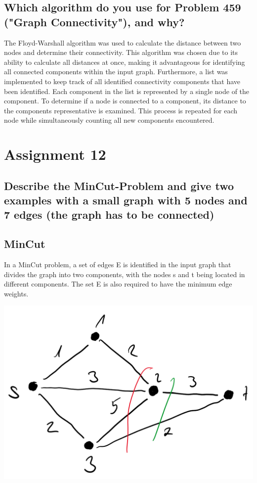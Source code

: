 \documentclass[runningheads]{llncs}
\begin{document}
\subsection*{Which algorithm do you use for Problem 459 ("Graph Connectivity"), and why?}
The Floyd-Warshall algorithm was used to calculate the distance between two nodes and determine their connectivity. This algorithm was chosen due to its ability to calculate all distances at once, making it advantageous for identifying all connected components within
the input graph. Furthermore, a list was implemented to keep track of all identified connectivity components that have been identified. Each component in the list is represented by a single node of the component. To determine if a node is connected to a component, its distance to the components
representative is examined. This process is repeated for each node while simultaneously counting all new components encountered.

\section*{Assignment 12}

\subsection*{Describe the MinCut-Problem and give two examples with a small graph with 5 nodes and 7 edges (the graph has to be connected)}

\subsection*{MinCut}
In a MinCut problem, a set of edges E is identified in the input graph that divides the graph into two components, with the nodes s and t being located in different components.
The set E is also required to have the minimum edge weights.

\includegraphics[scale=0.5]{./resources/graph_1}
\end{document}

